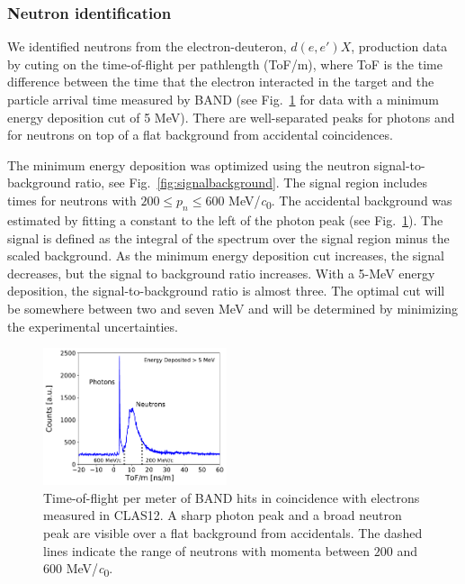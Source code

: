 \documentclass[3p,final,twocolumn]{elsarticle}
\begin{document}

\subsubsection{Neutron identification}
\label{sec:neutronidentification}
We identified neutrons from the electron-deuteron, $d(e,e')X$,
production data by cuting on the
time-of-flight per pathlength (ToF/m), where ToF is the time difference
between the time that the electron
interacted in the target and the particle arrival time measured by
BAND (see Fig.~\ref{fig:tof} for data with a minimum energy deposition
cut of 5 \si{\MeV}). There are well-separated peaks for
photons and for neutrons on top of a flat background from accidental coincidences. 

The minimum energy deposition was optimized using the neutron
signal-to-background ratio, see Fig.~\ref{fig:signalbackground}. The
signal region includes times for neutrons with $200\le p_n \le600$
\si{\MeV/\clight}. The accidental background was estimated by
fitting a constant to the left of the photon peak (see
Fig.~\ref{fig:tof}). The signal is defined as the integral of the
spectrum over the signal region minus the scaled background.  
As the minimum energy deposition cut increases, the signal decreases,
but the signal to background ratio increases.  
With a 5-\si{\MeV} energy deposition,
the signal-to-background ratio is almost three. The optimal cut will
be somewhere between two and seven \si{\MeV} and will be determined by
minimizing the experimental uncertainties.
\begin{figure}[tb]
	\centering
		\includegraphics[width=0.48\textwidth]{tofm-performance.pdf}
                \caption{Time-of-flight per meter of BAND hits in
                  coincidence with electrons measured in
                  CLAS12. A sharp photon peak and a broad neutron peak are visible
                  over a flat background from accidentals. The dashed
                  lines indicate the range of neutrons with momenta
                  between $200$ and $600$ \si{\MeV/\clight}.}
	\label{fig:tof}
\end{figure}
\end{document}
